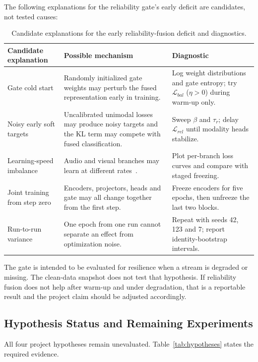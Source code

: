 \documentclass[conference]{IEEEtran}
\begin{document}
The following explanations for the reliability gate's early deficit are candidates, not tested causes:
\begin{table}[t]
\caption{Candidate explanations for the early reliability-fusion deficit and diagnostics.}
\label{tab:diagnostics}
\centering
\scriptsize
\setlength{\tabcolsep}{4pt}
\renewcommand{\arraystretch}{1.08}
\begin{tabular}{>{\raggedright\arraybackslash}p{}>{\raggedright\arraybackslash}p{}>{\raggedright\arraybackslash}p{}}
\toprule
\textbf{Candidate explanation} & \textbf{Possible mechanism} & \textbf{Diagnostic} \\
\midrule
Gate cold start & Randomly initialized gate weights may perturb the fused representation early in training. & Log weight distributions and gate entropy; try $\mathcal{L}_{bal}$ ($\eta>0$) during warm-up only. \\
Noisy early soft targets & Uncalibrated unimodal losses may produce noisy targets and the KL term may compete with fused classification. & Sweep $\beta$ and $\tau_r$; delay $\mathcal{L}_{rel}$ until modality heads stabilize. \\
Learning-speed imbalance & Audio and visual branches may learn at different rates~\cite{wang2020gblend,peng2022ogm}. & Plot per-branch loss curves and compare with staged freezing. \\
Joint training from step zero & Encoders, projectors, heads and gate may all change together from the first step. & Freeze encoders for five epochs, then unfreeze the last two blocks. \\
Run-to-run variance & One epoch from one run cannot separate an effect from optimization noise. & Repeat with seeds 42, 123 and 7; report identity-bootstrap intervals. \\
\bottomrule
\end{tabular}
\end{table}

The gate is intended to be evaluated for resilience when a stream is degraded or missing. The clean-data snapshot does not test that hypothesis. If reliability fusion does not help after warm-up and under degradation, that is a reportable result and the project claim should be adjusted accordingly.

\subsection{Hypothesis Status and Remaining Experiments}
All four project hypotheses remain unevaluated. Table~\ref{tab:hypotheses} states the required evidence.
\end{document}
